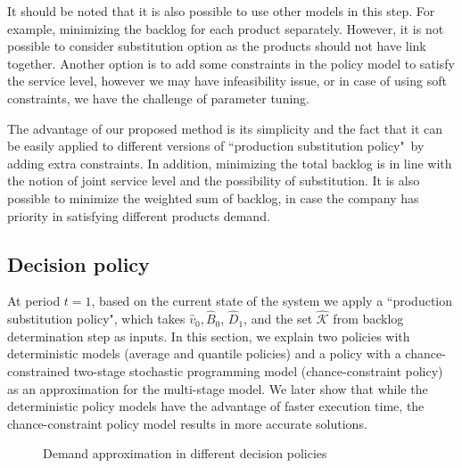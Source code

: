 \documentclass[10pt]{article}
\newcommand{\ti}{t} %
\newcommand{\KA}{\mathcal{K}}
\newcommand{\tAct}{\hat{\ti}} %
\newcommand{\PSpolicy}{``production substitution policy"}
\newcommand{\cred}{\color{red!65!black}}
\begin{document}
It should be noted that it is also possible to use other models in this step. For example, minimizing the backlog for each product separately. However, it is not possible to consider substitution option as the products should not have link together. Another option is to add some constraints in the policy model to satisfy the service level, however we may have infeasibility issue, or in case of using soft constraints, we have the challenge of parameter tuning.

The advantage of our proposed method is its simplicity and the fact that it can be easily applied to different versions of \PSpolicy \ by adding extra constraints. In addition, minimizing the total backlog is in line with the notion of joint service level and the possibility of substitution. It is also possible to minimize the weighted sum of backlog, in case the company has priority in satisfying different products demand. 

\subsection{Decision policy} %
At period $\ti =1$, based on the current state of the system we apply a \PSpolicy, which takes $\hat{v}_{0}, \hat{B}_{0}$, $\hat{D}_1$, and the set $\hat{\KA}$ from backlog determination step as inputs. 
In this section, we explain two policies with deterministic models (average and quantile policies) and a policy with a chance-constrained two-stage stochastic programming model (chance-constraint policy) as an approximation for the multi-stage model.
We later show that while the deterministic policy models have the advantage of faster execution time, the chance-constraint policy model results in more accurate solutions.
\begin{figure} [H]
    \centering 
    \caption{Demand approximation in different decision policies}%
    \label{fig:DemandPolicy}%
\end{figure}
\end{document}
